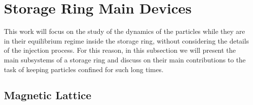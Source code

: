 \section{Storage Ring Main Devices} \label{sec:storage_ring_main_devices}

    This work will focus on the study of the dynamics of the particles while they are in their equilibrium regime inside the storage ring, without considering the details of the injection process. For this reason, in this subsection we will present the main subsystems of a storage ring and discuss on their main contributions to the task of keeping particles confined for such long times.

\subsection{Magnetic Lattice}

